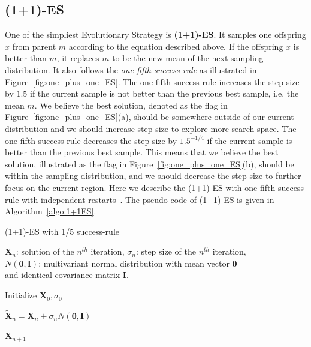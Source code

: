 \subsection{(1+1)-ES}
One of the simpliest Evolutionary Strategy is \textbf{(1+1)-ES}.
It samples one offspring $x$ from parent $m$ according to the equation described above.
If the offspring $x$ is better than $m$, it replaces $m$ to be the new mean of the next sampling distribution.
It also follows the \textit{one-fifth success rule} as illustrated in Figure~\ref{fig:one_plus_one_ES}.
The one-fifth success rule increases the step-size by $1.5$ if the current sample is not better than the previous best sample, i.e. the mean $m$.
We believe the best solution, denoted as the flag in Figure~\ref{fig:one_plus_one_ES}(a), 
should be somewhere outside of our current distribution and we should increase step-size to explore more search space.
The one-fifth success rule decreases the step-size by $1.5^{-1/4}$ if the current sample is better than the previous best sample.
This means that we believe the best solution, illustrated as the flag in Figure~\ref{fig:one_plus_one_ES}(b),
should be within the sampling distribution, and we should decrease the step-size to further focus on the current region.
Here we describe the (1+1)-ES with one-fifth success rule with independent restarts~\cite{Auger:2009:one_plus_one_ES}.
The pseudo code of (1+1)-ES is given in Algorithm~\ref{algo:1+1ES}.

\begin{algorithm}%
\caption{(1+1)-ES with 1/5 success-rule}\label{algo:1+1ES}

$\boldsymbol{X}_{n}$: solution of the $n^{th}$ iteration, $\sigma_n$: step size of the $n^{th}$ iteration, \\
$N(\boldsymbol{0}, \boldsymbol{I})$: multivariant normal distribution with mean vector $\boldsymbol{0}$ \\ 
and identical covariance matrix $\boldsymbol{I}$.

\BlankLine
{} 

\BlankLine
Initialize $\boldsymbol{X}_0, \sigma_0$ \\
 {

    $\widetilde{\boldsymbol{X}}_n = \boldsymbol{X}_n + \sigma_n N(\boldsymbol{0}, \boldsymbol{I})$  \\

}

\Return $\boldsymbol{X}_{n+1}$

\end{algorithm}



